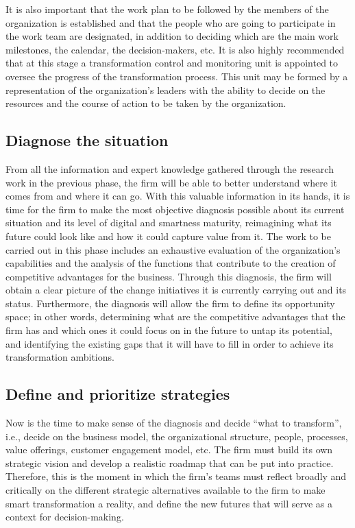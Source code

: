 \documentclass[
  letterpaper,
  DIV=11,
  numbers=noendperiod]{scrreprt}
\begin{document}
It is also important that the work plan to be followed by the members of
the organization is established and that the people who are going to
participate in the work team are designated, in addition to deciding
which are the main work milestones, the calendar, the decision-makers,
etc. It is also highly recommended that at this stage a transformation
control and monitoring unit is appointed to oversee the progress of the
transformation process. This unit may be formed by a representation of
the organization's leaders with the ability to decide on the resources
and the course of action to be taken by the organization.

\hypertarget{diagnose-the-situation}{%
\subsection{Diagnose the situation}\label{diagnose-the-situation}}

From all the information and expert knowledge gathered through the
research work in the previous phase, the firm will be able to better
understand where it comes from and where it can go. With this valuable
information in its hands, it is time for the firm to make the most
objective diagnosis possible about its current situation and its level
of digital and smartness maturity, reimagining what its future could
look like and how it could capture value from it. The work to be carried
out in this phase includes an exhaustive evaluation of the
organization's capabilities and the analysis of the functions that
contribute to the creation of competitive advantages for the business.
Through this diagnosis, the firm will obtain a clear picture of the
change initiatives it is currently carrying out and its status.
Furthermore, the diagnosis will allow the firm to define its opportunity
space; in other words, determining what are the competitive advantages
that the firm has and which ones it could focus on in the future to
untap its potential, and identifying the existing gaps that it will have
to fill in order to achieve its transformation ambitions.

\hypertarget{define-and-prioritize-strategies}{%
\subsection{Define and prioritize
strategies}\label{define-and-prioritize-strategies}}

Now is the time to make sense of the diagnosis and decide ``what to
transform'', i.e., decide on the business model, the organizational
structure, people, processes, value offerings, customer engagement
model, etc. The firm must build its own strategic vision and develop a
realistic roadmap that can be put into practice. Therefore, this is the
moment in which the firm's teams must reflect broadly and critically on
the different strategic alternatives available to the firm to make smart
transformation a reality, and define the new futures that will serve as
a context for decision-making.
\end{document}
